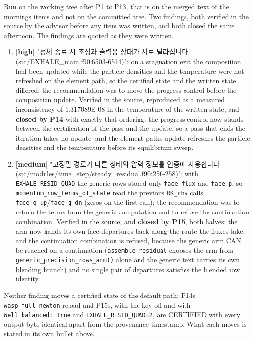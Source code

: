 \documentclass[english,a4paper]{my_memo}
\providecommand{\tightlist}{\setlength{\itemsep}{0pt}\setlength{\parskip}{0pt}}
\begin{document}
Run on the working tree after P1 to P13, that is on the merged text of the
morning\textquotesingle s items and not on the committed tree. Two findings, both verified in
the source by the advisor before any item was written, and both closed the
same afternoon. The findings are quoted as they were written.

\begin{enumerate}
\def\labelenumi{\arabic{enumi}.}
\tightlist
\item
  \textbf{{[}high{]}} "정체 종료 시 조성과 출력용 상태가 서로 달라집니다
  (src/EXHALE\_main.f90:6503-6514)": on a stagnation exit the composition had
  been updated while the particle densities and the temperature were not
  refreshed on the element path, so the certified state and the written state
  differed; the recommendation was to move the progress control before the
  composition update. Verified in the source, reproduced as a measured
  inconsistency of 1.317089E-08 in the temperature of the written state, and
  \textbf{closed by P14} with exactly that ordering: the progress control now
  stands between the certification of the pass and the update, so a pass that
  ends the iteration takes no update, and the element path\textquotesingle s update refreshes
  the particle densities and the temperature before its equilibrium sweep.
\item
  \textbf{{[}medium{]}} "고정밀 경로가 다른 상태의 압력 정보를 인증에 사용합니다
  (src/modules/time\_step/steady\_residual.f90:256-258)": with
  \texttt{EXHALE\_RESID\_QUAD} the generic rows stored only \texttt{face\_flux} and \texttt{face\_p},
  so \texttt{momentum\_row\_terms\_of\_state} read the previous \texttt{RK\_rhs} call\textquotesingle s
  \texttt{face\_q\_up}/\texttt{face\_q\_dn} (zeros on the first call); the recommendation was to
  return the terms from the generic computation and to refuse the continuation
  combination. Verified in the source, and \textbf{closed by P15}, both halves: the
  arm now hands its own face departures back along the route the fluxes take,
  and the continuation combination is refused, because the generic arm CAN be
  reached on a continuation (\texttt{assemble\_residual} chooses the arm from
  \texttt{generic\_precision\_rows\_arm()} alone and the generic text carries its own
  blending branch) and no single pair of departures satisfies the blended row
  identity.
\end{enumerate}

Neither finding moves a certified state of the default path: P14\textquotesingle s
\texttt{wasp\_full\_newton} reload and P15\textquotesingle s, with the key off and with
\texttt{Well\ balanced:\ True} and \texttt{EXHALE\_RESID\_QUAD=2}, are CERTIFIED with every
output byte-identical apart from the provenance timestamp. What each moves is
stated in its own bullet above.
\end{document}
